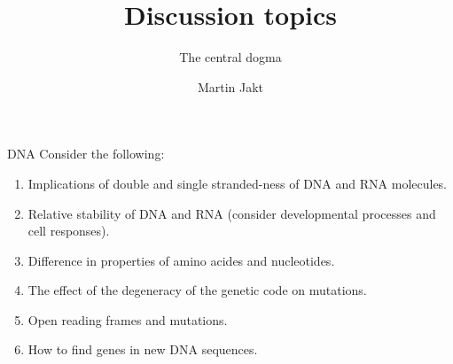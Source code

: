 \documentclass[pdf]{beamer}
\title{Discussion topics}
\subtitle{The central dogma}
\author{Martin Jakt}
\begin{document}
\begin{frame}
  \titlepage
\end{frame}

\begin{frame}{DNA}
  Consider the following:
  \begin{enumerate}
    \item Implications of double and single stranded-ness of DNA and RNA molecules.
    \item Relative stability of DNA and RNA (consider developmental processes and cell responses).
    \item Difference in properties of amino acides and nucleotides.
    \item The effect of the degeneracy of the genetic code on mutations.
    \item Open reading frames and mutations.
    \item How to find genes in new DNA sequences.
  \end{enumerate}
\end{frame}
\end{document}
